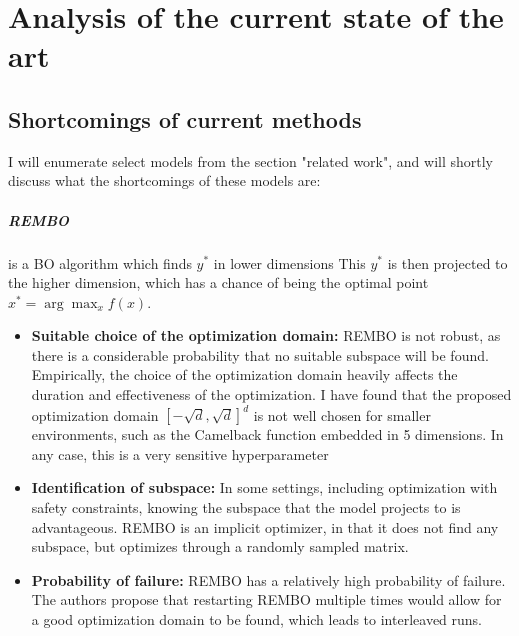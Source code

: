 \chapter{Analysis of the current state of the art}

\ifpdf
    \graphicspath{{Chapter3/Figs/Raster/}{Chapter3/Figs/PDF/}{Chapter3/Figs/}}
\else
    \graphicspath{{Chapter3/Figs/Vector/}{Chapter3/Figs/}}
\fi

\section{Shortcomings of current methods}
I will enumerate select models from the section "related work", and will shortly discuss what the shortcomings of these models are:

\paragraph{REMBO} is a BO algorithm which finds $y^*$ in lower dimensions This $y^*$ is then projected to the higher dimension, which has a chance of being the optimal point $x^* = \arg \max_{x} f(x)$. 

\begin{itemize}

\item \textbf{Suitable choice of the optimization domain:} REMBO is not robust, as there is a considerable probability that no suitable subspace will be found. 
Empirically, the choice of the optimization domain heavily affects the duration and effectiveness of the optimization.
I have found that the proposed optimization domain $ \left[ -\sqrt{d}, \sqrt{d}  \right]^d $ is not well chosen for smaller environments, such as the Camelback function embedded in 5 dimensions.
In any case, this is a very sensitive hyperparameter

\item \textbf{Identification of subspace:} In some settings, including optimization with safety constraints, knowing the subspace that the model projects to is advantageous. 
REMBO is an implicit optimizer, in that it does not find any subspace, but optimizes through a randomly sampled matrix.

\item \textbf{Probability of failure:} REMBO has a relatively high probability of failure. 
The authors propose that restarting REMBO multiple times would allow for a good optimization domain to be found, which leads to interleaved runs. 

\end{itemize}

